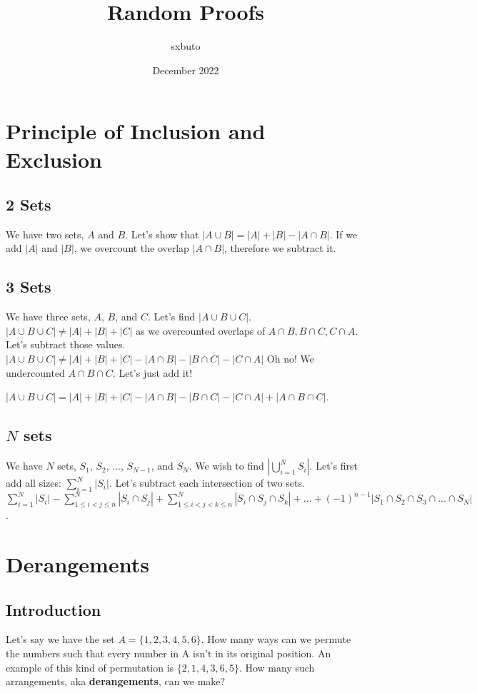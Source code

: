\documentclass{article}
\title{Random Proofs}
\author{sxbuto}
\date{December 2022}
\begin{document}
\maketitle

\section{Principle of Inclusion and Exclusion}
\subsection{2 Sets}
We have two sets, $A$ and $B$. Let's show that
$|A \cup B| = |A| + |B| - |A \cap B|$. If we add $|A|$ and $|B|$,
we overcount the overlap $|A \cap B|$, therefore we subtract it.
\subsection{3 Sets}
We have three sets, $A$, $B$, and $C$. Let's find $|A \cup B \cup C|$.
$|A \cup B \cup C| \neq |A| + |B| + |C|$
as we overcounted overlaps of $A \cap B, B \cap C, C \cap A$.
Let's subtract those values.
$|A \cup B \cup C| \neq
    |A| + |B| + |C| - |A \cap B| - |B \cap C| - |C \cap A|$
Oh no! We undercounted $A \cap B \cap C$. Let's just add it!\\
\begin{center}
    $|A \cup B \cup C| =
        |A| + |B| + |C|
        - |A \cap B| - |B \cap C| - |C \cap A| + |A \cap B \cap C|$.
\end{center}
\subsection{$N$ sets}
We have $N$ sets, $S_1$, $S_2$, ..., $S_{N-1}$, and $S_N$. We wish to find
$|\bigcup\limits_{i=1}^{N}S_i|$. Let's first add all sizes:
$\sum\limits_{i=1}^{N}|S_i|$. Let's subtract each intersection of two sets.
$\sum\limits_{i=1}^{N}|S_i| - \sum\limits_{1\leq{i}<j\leq{n}}^{N}|S_i \cap S_j| +
    \sum\limits_{1\leq{i}<j<k\leq{n}}^{N}|S_i \cap S_j \cap S_k| + ... +
    (-1)^{n-1}|S_1 \cap S_2 \cap S_3 \cap ... \cap S_N|$.
\section{Derangements}
\subsection{Introduction}
Let's say we have the set $A = \{1,2,3,4,5,6\}$. How many
ways can we permute the numbers such that every number
in A isn't in its original position. An example of
this kind of permutation is $\{2,1,4,3,6,5\}$. How many
such arrangements, aka \textbf{derangements}, can we make?
\end{document}
